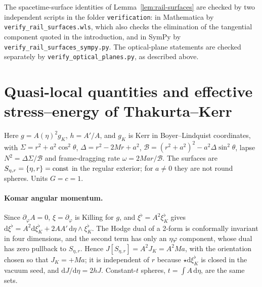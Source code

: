 \documentclass[12pt]{iopart}
\theoremstyle{plain}
\theoremstyle{definition}
\theoremstyle{remark}
\newcommand{\dd}{\mathrm{d}}
\begin{document}
The spacetime-surface identities of Lemma~\ref{lem:rail-surfaces} are checked by two
independent scripts in the folder \texttt{verification}: in Mathematica by \texttt{verify\_rail\_surfaces.wls}, which also
checks the elimination of the tangential component quoted in the introduction, and in
SymPy by \texttt{verify\_rail\_surfaces\_sympy.py}. The optical-plane statements are checked
separately by \texttt{verify\_optical\_planes.py}, as described above.

\section{Quasi-local quantities and effective stress--energy of Thakurta--Kerr}
\label{app:tk-energy}

Here $g=A(\eta)^2g_K$, $h=A'/A$, and $g_K$ is Kerr in Boyer--Lindquist coordinates,
with $\Sigma=r^2+a^2\cos^2\theta$, $\Delta=r^2-2Mr+a^2$,
$\mathcal B=(r^2+a^2)^2-a^2\Delta\sin^2\theta$, lapse $N^2=\Delta\Sigma/\mathcal B$ and
frame-dragging rate $\omega=2Mar/\mathcal B$. The surfaces are
$S_{\eta,r}=\{\eta,r\}={\rm const}$ in the regular exterior; for $a\neq0$ they are
not round spheres. Units $G=c=1$.

\paragraph{Komar angular momentum.}
Since $\partial_\varphi A=0$, $\xi=\partial_\varphi$ is Killing for $g$, and
$\xi^\flat=A^2\xi_K^\flat$ gives
$\dd\xi^\flat=A^2\dd\xi_K^\flat+2AA'\,\dd\eta\wedge\xi_K^\flat$. The Hodge dual of a
2-form is conformally invariant in four dimensions, and the second term has only
an $\eta\varphi$ component, whose dual has zero pullback to $S_{\eta,r}$. Hence
$J[S_{\eta,r}]=A^2J_K=A^2Ma$, with the orientation chosen so that $J_K=+Ma$; it is
independent of $r$ because $\star\dd\xi_K^\flat$ is closed in the vacuum seed, and
$\dd J/\dd\eta=2hJ$. Constant-$t$ spheres, $t=\int A\,\dd\eta$, are the same sets.
\end{document}

